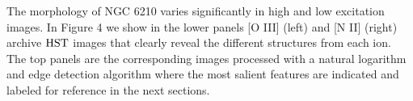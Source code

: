 \documentclass[useAMS, usenatbib]{mnras}
\makeatletter
\newcounter{ionstage}
\renewcommand{\ion}[2]{\setcounter{ionstage}{#2}%
  \ensuremath{\mathrm{#1\,\scriptstyle\Roman{ionstage}}}}
\newcommand\oiii{[\ion{O}{3}]}
\newcommand{\kms}{\ensuremath{\mathrm{km\ s}^{-1}}}
\newcommand\NIIlam{[\ion{N}{2}]\,6583\,}
\newcommand\OIIIlam{[\ion{O}{3}]\,5007\,\AA\@}
\newcommand\Halam{H$\alpha$\,6563\,\AA\@}
\makeatother
\begin{document}
The morphology of NGC 6210 varies significantly in high and low excitation images. In Figure 4 we show in the lower panels [O III] (left) and [N II] (right) archive $\rm HST$ images that clearly reveal the different structures from each ion.
The top panels are the corresponding images processed with a natural logarithm and edge detection algorithm where the most salient features are indicated and labeled for reference in the next sections.












\end{document}
